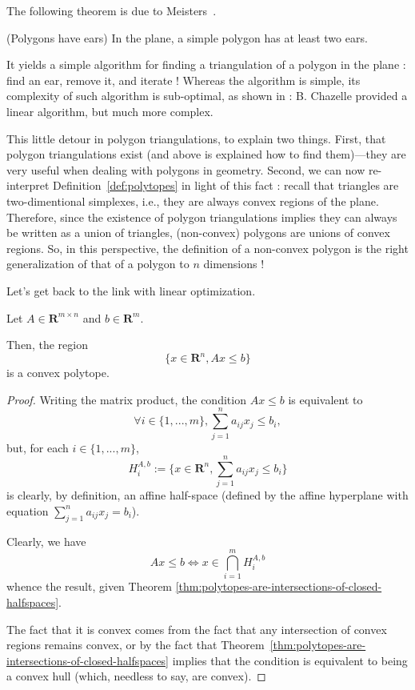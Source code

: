 The following theorem is due to Meisters~\cite{meisters1975}.

\begin{theorem}(Polygons have ears)
    In the plane, a simple polygon has at least two ears.
\end{theorem}

\begin{remark}
    It yields a simple algorithm for finding a triangulation of a polygon in the plane : find an ear, remove it, and iterate ! Whereas the algorithm is simple, its complexity of such algorithm is sub-optimal, as shown in \cite{chazelle1991} : B. Chazelle provided a linear algorithm, but much more complex.
\end{remark}

\begin{remark}
    This little detour in polygon triangulations, to explain two things. First, that polygon triangulations exist (and above is explained how to find them)---they are very useful when dealing with polygons in geometry. Second, we can now re-interpret Definition~\ref{def:polytopes} in light of this fact : recall that triangles are two-dimentional simplexes, i.e., they are always convex regions of the plane. Therefore, since the existence of polygon triangulations implies they can always be written as a union of triangles, (non-convex) polygons are unions of convex regions. So, in this perspective, the definition of a non-convex polygon is the right generalization of that of a polygon to $ n $ dimensions !
\end{remark}

Let's get back to the link with linear optimization.

\begin{theorem}
    Let $ A \in \mathbf R^{m \times n} $ and $ b \in \mathbf R^m $.

    Then, the region
    \[
        \{ x \in \mathbf R^n, Ax \leqslant b \}
    \]
    is a convex polytope.
\end{theorem}

\begin{proof}
    Writing the matrix product, the condition $ Ax \leqslant b $ is equivalent to
    \[
        \forall i \in \{ 1, ..., m \}, \sum_{j=1}^n a_{ij} x_j \leqslant b_i,
    \]
    but, for each $ i \in \{ 1, ..., m \} $,
    \[
        H_i^{A,b} := \{ x \in \mathbf R^n, \sum_{j=1}^n a_{ij} x_j \leqslant b_i \} 
    \]
    is clearly, by definition, an affine half-space (defined by the affine hyperplane with equation $ \sum\limits _{j=1}^na_{ij} x_j = b_i $).

    Clearly, we have
    \[
        Ax \leqslant b \iff x \in \bigcap_{i=1}^m H_i^{A,b}
    \]
    whence the result, given Theorem \ref{thm:polytopes-are-intersections-of-closed-halfspaces}.

    The fact that it is convex comes from the fact that any intersection of convex regions remains convex, or by the fact that Theorem~\ref{thm:polytopes-are-intersections-of-closed-halfspaces} implies that the condition is equivalent to being a convex hull (which, needless to say, are convex).
\end{proof}

